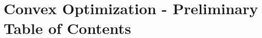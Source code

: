 \documentclass[11pt,a4paper]{memoir}
\begin{document}









%

\mainmatter

%

\section*{Convex Optimization - Preliminary Table of Contents}
\end{document}
